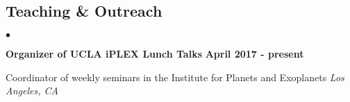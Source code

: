 \documentclass[margin,line]{res}
\newenvironment{list1}{
  \begin{list}{\ding{113}}{%
      \setlength{\itemsep}{0in}
      \setlength{\parsep}{0in} \setlength{\parskip}{0in}
      \setlength{\topsep}{0in} \setlength{\partopsep}{0in} 
      \setlength{\leftmargin}{0.17in}}}{\end{list}}
\newenvironment{list2}{
  \begin{list}{$\bullet$}{%
      \setlength{\itemsep}{0in}
      \setlength{\parsep}{0in} \setlength{\parskip}{0in}
      \setlength{\topsep}{0in} \setlength{\partopsep}{0in} 
      \setlength{\leftmargin}{0.2in}}}{\end{list}}
\begin{document}
\begin{resume}
%
%
%
%

\section{\sc Teaching \& Outreach}
\begin{list2}

\item[] {\bf Organizer of UCLA iPLEX Lunch Talks } \hfill {\bf April 2017 - present}
\begin{list1}
\item[] Coordinator of weekly seminars in the Institute for Planets and Exoplanets \hfill \textit{Los Angeles, CA}
\end{list1}


\end{list2}
\end{resume}
\end{document}
